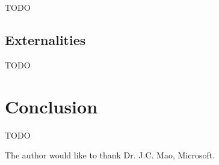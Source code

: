 \documentclass[prodmode,acmtist]{acmsmall} %
\begin{document}
TODO


\subsection{Externalities} %
\label{sub:externalities}

TODO


\section{Conclusion} %
\label{sec:conclusion}

TODO

\begin{acks}
The author would like to thank Dr. J.C. Mao, Microsoft.
\end{acks}




\end{document}
